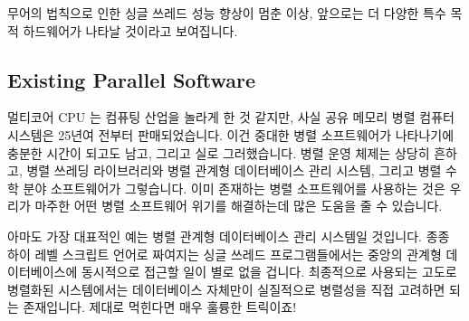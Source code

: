 무어의 법칙으로 인한 싱글 쓰레드 성능 향상이 멈춘 이상, 앞으로는 더 다양한 특수
목적 하드웨어가 나타날 것이라고 보여집니다.

\iffalse
Unlike the server and PC arena, smartphones have long used a wide
variety of hardware accelerators.
These hardware accelerators are often used for media decoding,
so much so that a high-end MP3 player might be able to play audio
for several minutes---with its CPU fully powered off the entire time.
The purpose of these accelerators is to improve energy efficiency
and thus extend battery life: special purpose hardware can often
compute more efficiently than can a general-purpose CPU.
This is another example of the principle called out in
Section~\ref{sec:intro:Generality}: Generality is almost never free.

Nevertheless, given the end of Moore's-Law-induced single-threaded
performance increases, it seems safe to predict that there will
be an increasing variety of special-purpose hardware going forward.
\fi

\subsection{Existing Parallel Software}
\label{sec:cpu:Existing Parallel Software}

멀티코어 CPU 는 컴퓨팅 산업을 놀라게 한 것 같지만, 사실 공유 메모리 병렬 컴퓨터
시스템은 25년여 전부터 판매되었습니다.
이건 중대한 병렬 소프트웨어가 나타나기에 충분한 시간이 되고도 남고, 그리고 실로
그러했습니다.
병렬 운영 체제는 상당히 흔하고, 병렬 쓰레딩 라이브러리와 병렬 관계형
데이터베이스 관리 시스템, 그리고 병렬 수학 분야 소프트웨어가 그렇습니다.
이미 존재하는 병렬 소프트웨어를 사용하는 것은 우리가 마주한 어떤 병렬
소프트웨어 위기를 해결하는데 많은 도움을 줄 수 있습니다.

\iffalse
Although multicore CPUs seem to have taken the computing industry
by surprise, the fact remains that shared-memory parallel computer
systems have been commercially available for more than a quarter
century.
This is more than enough time for significant parallel software
to make its appearance, and it indeed has.
Parallel operating systems are quite commonplace, as are parallel
threading libraries, parallel relational database management systems, 
and parallel numerical software.
Use of existing parallel software can go a long ways towards solving any
parallel-software crisis we might encounter.
\fi

아마도 가장 대표적인 예는 병렬 관계형 데이터베이스 관리 시스템일 것입니다.
종종 하이 레벨 스크립트 언어로 짜여지는 싱글 쓰레드 프로그램들에서는 중앙의
관계형 데이터베이스에 동시적으로 접근할 일이 별로 없을 겁니다.
최종적으로 사용되는 고도로 병렬화된 시스템에서는 데이터베이스 자체만이
실질적으로 병렬성을 직접 고려하면 되는 존재입니다.
제대로 먹힌다면 매우 훌륭한 트릭이죠!

\iffalse
Perhaps the most common example is the parallel relational database
management system.
It is not unusual for single-threaded programs, often written in
high-level scripting languages, to access a central relational
database concurrently.
In the resulting highly parallel system, only the database need actually
deal directly with parallelism.
A very nice trick when it works!
\fi
